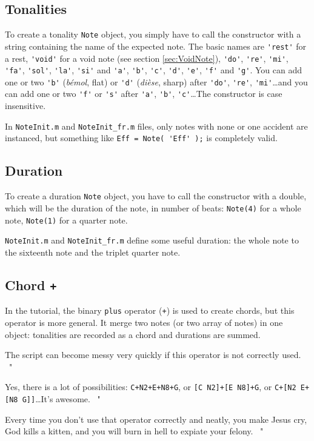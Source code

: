 \documentclass{article}
\newcommand\noteInitFile{\texttt{NoteInit.m}\xspace}
\newcommand\noteInitFrFile{\texttt{NoteInit\_fr.m}\xspace}
\newenvironment{meenv}{ \par \noindent \makebox[6em][r]{ \textcolor{mecolor}{Me}: " --~}}{~"}
\newenvironment{myselfenv}{ \par \noindent \makebox[6em][r]{ \textcolor{myselfcolor}{Myself}: " --~}}{~"}
\newcommand{ \me }[1]{%
\begin{meenv}%
	#1%
\end{meenv} }
\newcommand{ \myself }[1]{%
\begin{myselfenv}%
	#1%
\end{myselfenv} }
\begin{document}
\subsection{Tonalities}
\label{sec:Tonalities}

To create a tonality \lstinline!Note! object, you simply have to call the constructor with a string containing the name of the expected note. The basic names are \lstinline!'rest'! for a rest, \lstinline!'void'! for a void note (see section \ref{sec:VoidNote}), \lstinline!'do'!, \lstinline!'re'!, \lstinline!'mi'!, \lstinline!'fa'!, \lstinline!'sol'!, \lstinline!'la'!, \lstinline!'si'! and \lstinline!'a'!, \lstinline!'b'!, \lstinline!'c'!, \lstinline!'d'!, \lstinline!'e'!, \lstinline!'f'! and \lstinline!'g'!. You can add one or two \lstinline!'b'! (\emph{b\'emol}, flat) or \lstinline!'d'! (\emph{di\`ese}, sharp) after \lstinline!'do'!, \lstinline!'re'!, \lstinline!'mi'!\dots and you can add one or two \lstinline!'f'! or \lstinline!'s'! after \lstinline!'a'!, \lstinline!'b'!, \lstinline!'c'!\dots The constructor is case insensitive.

In \noteInitFile and \noteInitFrFile files, only notes with none or one accident are instanced, but something like \lstinline!Eff = Note( 'Eff' );! is completely valid.

\subsection{Duration}
\label{sec:Duration}

To create a duration \lstinline!Note! object, you have to call the constructor with a double, which will be the duration of the note, in number of beats: \lstinline!Note(4)! for a whole note, \lstinline!Note(1)! for a quarter note.

\noteInitFile and \noteInitFrFile define some useful duration: the whole note to the sixteenth note and the triplet quarter note.

\subsection{Chord \lstinline!+!}
\label{sec:Chord}

In the tutorial, the binary \lstinline!plus! operator (\lstinline!+!) is used to create chords, but this operator is more general. It merge two notes (or two array of notes) in one object: tonalities are recorded as a chord and durations are summed.

\myself{The script can become messy very quickly if this operator is not correctly used.}
\me{Yes, there is a lot of possibilities: \lstinline!C+N2+E+N8+G!, or \lstinline![C N2]+[E N8]+G!, or \lstinline!C+[N2 E+[N8 G]]!\dots It's awesome.}
\myself{Every time you don't use that operator correctly and neatly, you make Jesus cry, God kills a kitten, and you will burn in hell to expiate your felony.}
\end{document}
